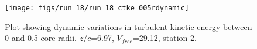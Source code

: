 \begin{figure}[H]
\centering
\texttt{[image: figs/run\_18/run\_18\_ctke\_005rdynamic]}
\caption{Plot showing dynamic variations in turbulent kinetic energy between 0 and 0.5 core radii. $z/c$=6.97, $V_{free}$=29.12, station 2.}
\label{fig:run_18_ctke_005rdynamic}
\end{figure}


